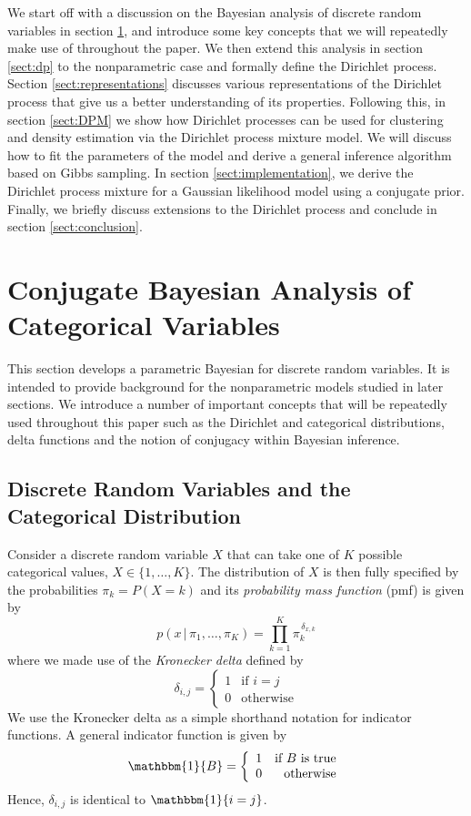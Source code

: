 \documentclass[final,3p,times,twocolumn]{elsarticle}
\begin{document}
We start off with a discussion on the Bayesian analysis of discrete random variables in section \ref{sect:parametric}, and introduce some key concepts that we will repeatedly make use of throughout the paper.
We then extend this analysis in section \ref{sect:dp} to the nonparametric case and formally define the Dirichlet process.
Section \ref{sect:representations} discusses various representations of the Dirichlet process that give us a better understanding of its properties.
Following this, in section \ref{sect:DPM} we show how Dirichlet processes can be used for clustering and density estimation via the Dirichlet process mixture model. 
We will discuss how to fit the parameters of the model and derive a general inference algorithm based on Gibbs sampling.
In section \ref{sect:implementation}, we derive the Dirichlet process mixture for a Gaussian likelihood model using a conjugate prior.
Finally, we briefly discuss extensions to the Dirichlet process and conclude in section \ref{sect:conclusion}.


\section{Conjugate Bayesian Analysis of Categorical Variables}
\label{sect:parametric}
This section develops a parametric Bayesian for discrete random variables.
It is intended to provide background for the nonparametric models studied in later sections.
We introduce a number of important concepts that will be repeatedly used throughout this paper such as the Dirichlet and categorical distributions, delta functions and the notion of conjugacy within Bayesian inference. 

\subsection{Discrete Random Variables and the Categorical Distribution}
Consider a discrete random variable $X$ that can take one of $K$ possible categorical values, $X \in \{1,\dots,K\}$.
The distribution of $X$ is then fully specified by the probabilities $\pi_k = P(X = k)$ and its \emph{probability mass function} (pmf) is given by
\begin{equation*}
p(x\,|\,\pi_1,\dots,\pi_K) = \prod_{k=1}^K \pi_k^{\,\delta_{x,k}}
\end{equation*}
where we made use of the \emph{Kronecker delta} defined by
\begin{equation*}
\delta_{i,j} = \left\{\begin{array}{lr}
1 & \mbox{if $i = j$}\\
0 & \mbox{otherwise} \end{array} \right.
\end{equation*}
We use the Kronecker delta as a simple shorthand notation for indicator functions.
A general indicator function is given by
\begin{equation*}
\mathbbm{1}\{B\} = \left\{\begin{array}{lr}
1 & \mbox{if $B$ is true}\\
0 & \mbox{otherwise} \end{array} \right.
\end{equation*}
Hence, $\delta_{i,j}$ is identical to $\mathbbm{1}\{i=j\}$.
\end{document}
